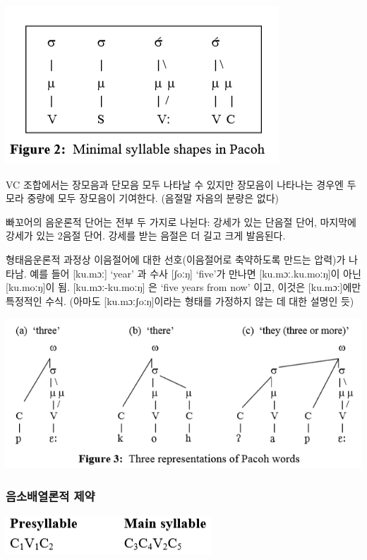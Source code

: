 \begin{center}
\includegraphics{Pacoh/src/PacohFigure2.png}
\end{center}

VC 조합에서는 장모음과 단모음 모두 나타날 수 있지만 장모음이 나타나는 경우엔 두 모라 중량에 모두 장모음이 기여한다. (음절말 자음의 분량은 없다)

빠꼬어의 음운론적 단어는 전부 두 가지로 나뉜다: 강세가 있는 단음절 단어, 마지막에 강세가 있는 2음절 단어. 강세를 받는 음절은 더 길고 크게 발음된다.

형태음운론적 과정상 이음절어에 대한 선호(이음절어로 축약하도록 만드는 압력)가 나타남.
예를 들어 [ku.mɔː] `year' 과 수사 [ʃoːŋ] `five'가 만나면 [ku.mɔː.ku.moːŋ]이 아닌 [ku.moːŋ]이 됨. [ku.mɔː-ku.moːŋ] 은 `five years from now' 이고, 이것은 [ku.mɔː]에만 특정적인 수식. (아마도 [ku.mɔːʃoːŋ]이라는 형태를 가정하지 않는 데 대한 설명인 듯)

\begin{center}
\includegraphics{Pacoh/src/PacohFigure3.png}
\end{center}

\subsubsection{음소배열론적 제약}
\includegraphics{Pacoh/src/Pacohsyllablestructure.png}

